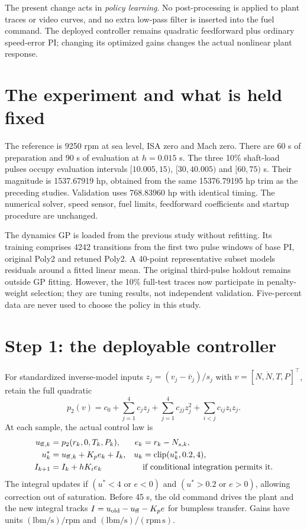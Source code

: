 The present change acts in \emph{policy learning}. No post-processing is applied to plant traces or video curves, and no extra low-pass filter is inserted into the fuel command. The deployed controller remains quadratic feedforward plus ordinary speed-error PI; changing its optimized gains changes the actual nonlinear plant response.

\section{The experiment and what is held fixed}
The reference is 9250 rpm at sea level, ISA zero and Mach zero. There are 60 s of preparation and 90 s of evaluation at $h=0.015$ s. The three 10\% shaft-load pulses occupy evaluation intervals $[10.005,15)$, $[30,40.005)$ and $[60,75)$ s. Their magnitude is 1537.67919 hp, obtained from the same 15376.79195 hp trim as the preceding studies. Validation uses 768.83960 hp with identical timing. The numerical solver, speed sensor, fuel limits, feedforward coefficients and startup procedure are unchanged.

The dynamics GP is loaded from the previous study without refitting. Its training comprises 4242 transitions from the first two pulse windows of base PI, original Poly2 and retuned Poly2. A 40-point representative subset models residuals around a fitted linear mean. The original third-pulse holdout remains outside GP fitting. However, the 10\% full-test traces now participate in penalty-weight selection; they are tuning results, not independent validation. Five-percent data are never used to choose the policy in this study.

\section{Step 1: the deployable controller}
For standardized inverse-model inputs $z_j=(v_j-\bar v_j)/s_j$ with $v=[N,\dot N,T,P]^\top$, retain the full quadratic
\begin{equation}
p_2(v)=c_0+\sum_{j=1}^4c_jz_j+\sum_{j=1}^4c_{jj}z_j^2+\sum_{i<j}c_{ij}z_iz_j.
\end{equation}
At each sample, the actual control law is
\begin{align}
u_{{\rm ff},k}&=p_2(r_k,0,T_k,P_k),& e_k&=r_k-N_{s,k},\\
u_k^*&=u_{{\rm ff},k}+K_pe_k+I_k,&u_k&=\operatorname{clip}(u_k^*,0.2,4),\\
I_{k+1}&=I_k+hK_ie_k&&\text{if conditional integration permits it.}
\end{align}
The integral updates if $(u^*<4\text{ or }e<0)$ and $(u^*>0.2\text{ or }e>0)$, allowing correction out of saturation. Before 45 s, the old command drives the plant and the new integral tracks $I=u_{\rm old}-u_{\rm ff}-K_pe$ for bumpless transfer. Gains have units $(\mathrm{lbm/s})/\mathrm{rpm}$ and $(\mathrm{lbm/s})/(\mathrm{rpm\,s})$.


